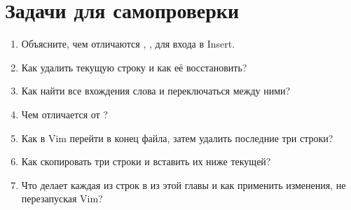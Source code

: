 \section{Задачи для самопроверки}
\begin{enumerate}
  \item Объясните, чем отличаются , , 
    для входа в Insert.
  \item Как удалить текущую строку и как её восстановить?
  \item Как найти все вхождения слова и переключаться между
    ними?
  \item Чем  отличается от ?
  \item Как в Vim перейти в конец файла, затем удалить
    последние три строки?
  \item Как скопировать три строки и вставить их ниже текущей?
  \item Что делает каждая из строк в  из этой главы и
    как применить изменения, не перезапуская Vim?
\end{enumerate}
